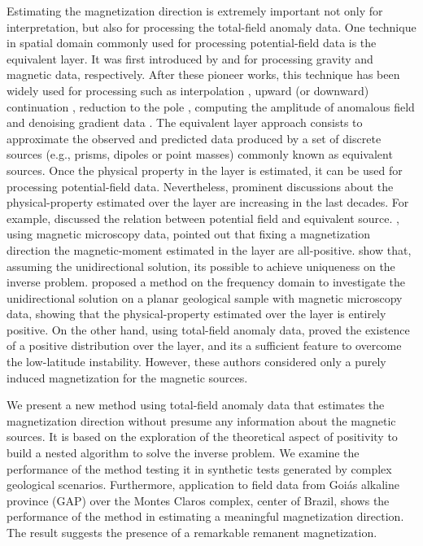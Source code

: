 Estimating the magnetization direction is extremely important not only for interpretation, but also for processing the total-field anomaly data. One technique in spatial domain commonly used for processing potential-field data is the equivalent layer. It was first introduced by \cite{dampney1969} and \cite{emilia_massey_1974} for processing gravity and magnetic data, respectively. After these pioneer works, this technique has been widely used for processing such as interpolation \citep{cordell_1992,mendonca-silva_1994,barnes-lumley_2011,siqueira_etal_2017}, upward (or downward) continuation  \citep{hansen-miyazaki_1984,li-oldenburg_2010}, reduction to the pole \citep{silva_1986,leao-silva_1989,guspi-novara_2009,oliveirajr-etal_2013}, computing the amplitude of anomalous field \citep{li_li_2014} and denoising gradient data \citep{martinez_li_2016}. The equivalent layer approach consists to approximate the observed and predicted data produced by a set of discrete sources (e.g., prisms, dipoles or point masses) commonly known as equivalent sources. Once the physical property in the layer is estimated, it can be used for processing potential-field data. Nevertheless, prominent discussions about the physical-property estimated over the layer are increasing in the last decades. For example, \cite{pedersen1991} discussed the relation between potential field and equivalent source. \cite{weiss2007}, using magnetic microscopy data, pointed out that fixing a magnetization direction the magnetic-moment estimated in the layer are all-positive. \cite{baratchart2013} show that, assuming the unidirectional solution, its possible to achieve uniqueness on the inverse problem. \cite{lima2013} proposed a method on the frequency domain to investigate the unidirectional solution on a planar geological sample with magnetic microscopy data, showing that the physical-property estimated over the layer is entirely positive. On the other hand, \cite{li_nabighian_oldenburg_2014} using total-field anomaly data, proved the existence of a positive distribution over the layer, and its a sufficient feature to overcome the low-latitude instability. However, these authors considered only a purely induced magnetization for the magnetic sources.

We present a new method using total-field anomaly data that estimates the magnetization direction without presume any information about the magnetic sources. It is based on the exploration of the theoretical aspect of positivity to build a nested algorithm to solve the inverse problem. We examine the performance of the method testing it in synthetic tests generated by complex geological scenarios. Furthermore, application to field data from Goiás alkaline province (GAP) over the Montes Claros complex, center of Brazil, shows the performance of the method in estimating a meaningful magnetization direction. The result suggests the presence of a remarkable remanent magnetization.    

